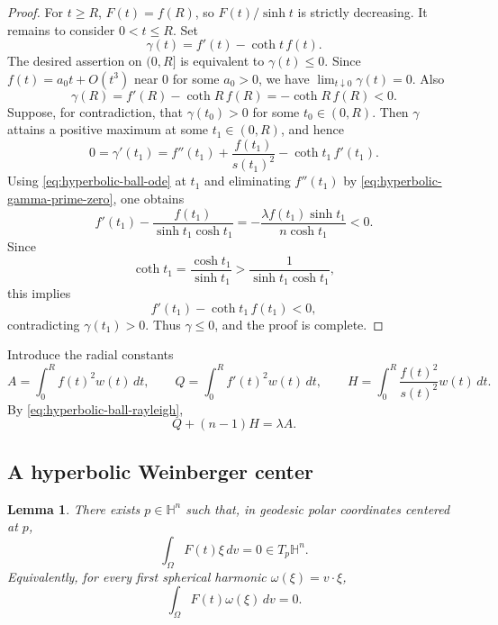 \documentclass[11pt]{amsart}
\newtheorem{lemma}[theorem]{Lemma}
\theoremstyle{remark}
\newcommand{\HH}{\mathbb H}
\begin{document}
\begin{proof}
For $t\ge R$, $F(t)=f(R)$, so $F(t)/\sinh t$ is strictly decreasing.  It remains to consider $0<t\le R$.
Set
$$
        \gamma(t)=f'(t)-\coth t\,f(t).
$$
The desired assertion on $(0,R]$ is equivalent to $\gamma(t)\le0$.  Since $f(t)=a_0t+O(t^3)$ near $0$ for some $a_0>0$, we have $\lim_{t\downarrow0}\gamma(t)=0$.  Also
$$
        \gamma(R)=f'(R)-\coth R\,f(R)=-\coth R\,f(R)<0.
$$
Suppose, for contradiction, that $\gamma(t_0)>0$ for some $t_0\in(0,R)$.  Then $\gamma$ attains a positive maximum at some $t_1\in(0,R)$, and hence
\begin{equation}\label{eq:hyperbolic-gamma-prime-zero}
        0=\gamma'(t_1)=f''(t_1)+\frac{f(t_1)}{s(t_1)^2}-\coth t_1\,f'(t_1).
\end{equation}
Using \eqref{eq:hyperbolic-ball-ode} at $t_1$ and eliminating $f''(t_1)$ by \eqref{eq:hyperbolic-gamma-prime-zero}, one obtains
$$
        f'(t_1)-\frac{f(t_1)}{\sinh t_1\cosh t_1}
        =-\frac{\lambda f(t_1)\sinh t_1}{n\cosh t_1}<0.
$$
Since
$$
        \coth t_1=\frac{\cosh t_1}{\sinh t_1}
        >\frac{1}{\sinh t_1\cosh t_1},
$$
this implies
$$
        f'(t_1)-\coth t_1\,f(t_1)<0,
$$
contradicting $\gamma(t_1)>0$.  Thus $\gamma\le0$, and the proof is complete.
\end{proof}

Introduce the radial constants
\begin{equation}\label{eq:hyperbolic-AQH-def}
        A=\int_0^R f(t)^2w(t)\,dt,
        \qquad
        Q=\int_0^R f'(t)^2w(t)\,dt,
        \qquad
        H=\int_0^R \frac{f(t)^2}{s(t)^2}w(t)\,dt.
\end{equation}
By \eqref{eq:hyperbolic-ball-rayleigh},
\begin{equation}\label{eq:hyperbolic-eigen-identity}
        Q+(n-1)H=\lambda A.
\end{equation}

\subsection{A hyperbolic Weinberger center}

\begin{lemma}\label{lem:hyperbolic-center}
There exists $p\in\HH^n$ such that, in geodesic polar coordinates centered at $p$,
\begin{equation}\label{eq:hyperbolic-center}
        \int_\Omega F(t)\xi\,dv=0\in T_p\HH^n.
\end{equation}
Equivalently, for every first spherical harmonic $\omega(\xi)=v\cdot\xi$,
$$
        \int_\Omega F(t)\omega(\xi)\,dv=0.
$$
\end{lemma}
\end{document}
